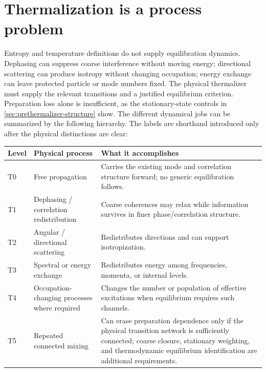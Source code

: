 \documentclass[11pt]{article}
\theoremstyle{definition}
\begin{document}
\section{Thermalization is a process problem}
\label{sec:hierarchy}
Entropy and temperature definitions do not supply equilibration dynamics.
Dephasing can suppress coarse interference without moving energy; directional
scattering can produce isotropy without changing occupation; energy exchange
can leave protected particle or mode numbers fixed.  The physical thermalizer
must supply the relevant transitions and a justified equilibrium criterion.
Preparation loss alone is insufficient, as the stationary-state controls in \cref{sec:prethermalizer-structure} show.  The different dynamical jobs can be summarized by the following hierarchy.  The labels
are shorthand introduced only after the physical distinctions are clear:
\begin{center}
\renewcommand{\arraystretch}{1.24}
\begin{tabularx}{\textwidth}{@{}P{0.08\textwidth}P{0.29\textwidth}Y@{}}
\toprule
Level & Physical process & What it accomplishes \\
\midrule
T0 & Free propagation
& Carries the existing mode and correlation structure forward; no generic equilibration follows. \\
T1 & Dephasing / correlation redistribution
& Coarse coherences may relax while information survives in finer phase/correlation structure. \\
T2 & Angular / directional scattering
& Redistributes directions and can support isotropization. \\
T3 & Spectral or energy exchange
& Redistributes energy among frequencies, momenta, or internal levels. \\
T4 & Occupation-changing processes where required
& Changes the number or population of effective excitations when equilibrium requires such channels. \\
T5 & Repeated connected mixing
& Can erase preparation dependence only if the physical transition network is sufficiently connected; coarse closure, stationary weighting, and thermodynamic equilibrium identification are additional requirements. \\
\bottomrule
\end{tabularx}
\end{center}
\end{document}
